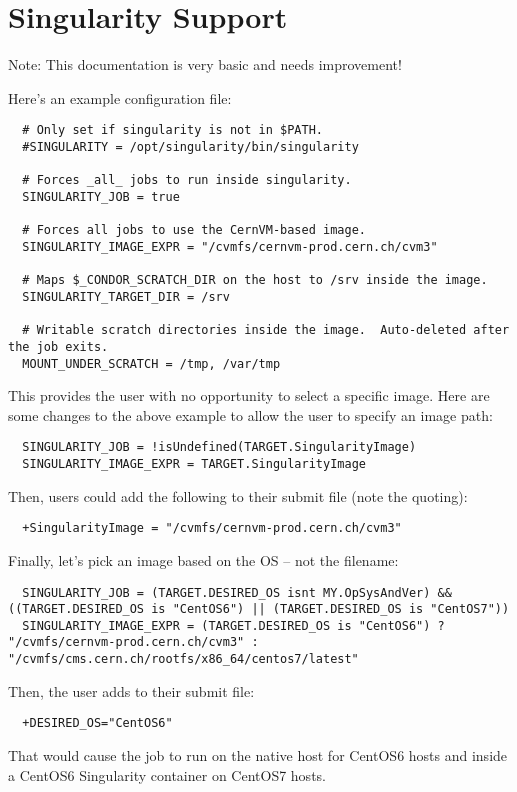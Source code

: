 \section{\label{sec:singularity-support}Singularity Support}


Note:  This documentation is very basic and needs improvement!

Here's an example configuration file:

\begin{verbatim}
  # Only set if singularity is not in $PATH.
  #SINGULARITY = /opt/singularity/bin/singularity

  # Forces _all_ jobs to run inside singularity.
  SINGULARITY_JOB = true

  # Forces all jobs to use the CernVM-based image.
  SINGULARITY_IMAGE_EXPR = "/cvmfs/cernvm-prod.cern.ch/cvm3"

  # Maps $_CONDOR_SCRATCH_DIR on the host to /srv inside the image.
  SINGULARITY_TARGET_DIR = /srv

  # Writable scratch directories inside the image.  Auto-deleted after the job exits.
  MOUNT_UNDER_SCRATCH = /tmp, /var/tmp
\end{verbatim}

This provides the user with no opportunity to select a specific image.
Here are some changes to the above example to allow the user to specify an
image path:

\begin{verbatim}
  SINGULARITY_JOB = !isUndefined(TARGET.SingularityImage)
  SINGULARITY_IMAGE_EXPR = TARGET.SingularityImage
\end{verbatim}

Then, users could add the following to their submit file
(note the quoting):

\begin{verbatim}
  +SingularityImage = "/cvmfs/cernvm-prod.cern.ch/cvm3"
\end{verbatim}

Finally, let's pick an image based on the OS -- not the filename:

\begin{verbatim}
  SINGULARITY_JOB = (TARGET.DESIRED_OS isnt MY.OpSysAndVer) && ((TARGET.DESIRED_OS is "CentOS6") || (TARGET.DESIRED_OS is "CentOS7"))
  SINGULARITY_IMAGE_EXPR = (TARGET.DESIRED_OS is "CentOS6") ? "/cvmfs/cernvm-prod.cern.ch/cvm3" : "/cvmfs/cms.cern.ch/rootfs/x86_64/centos7/latest"
\end{verbatim}

Then, the user adds to their submit file:

\begin{verbatim}
  +DESIRED_OS="CentOS6"
\end{verbatim}

That would cause the job to run on the native host for CentOS6 hosts
and inside a CentOS6 Singularity container on CentOS7 hosts.
